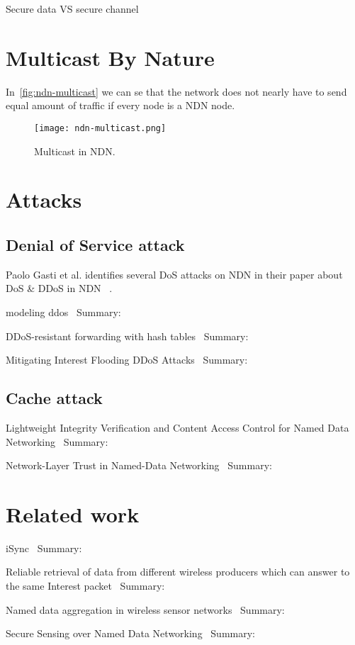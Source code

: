Secure data VS secure channel

\section{Multicast By Nature}\label{ndn-multicast}

In~\autoref{fig:ndn-multicast} we can se that the network does not nearly have to send equal amount of traffic if every node is a \gls{NDN} node.
\begin{figure}[ht]
  \centering
  \texttt{[image: ndn-multicast.png]}
  \caption{Multicast in NDN.}
  \label{fig:ndn-multicast}
\end{figure}

\section{Attacks}

\subsection{Denial of Service attack}
Paolo Gasti et al. identifies several \gls{DoS} attacks on \gls{NDN} in their paper about \gls{DoS} \& \gls{DDoS} in \gls{NDN} ~\cite{DBLP:conf/icccn/GastiTU013}. 


modeling ddos~\cite{DBLP:journals/ijcomsys/WangCZQZ14}
Summary:


DDoS-resistant forwarding with hash tables~\cite{DBLP:conf/ancs/SoNO13}
Summary:


Mitigating Interest Flooding DDoS Attacks~\cite{DBLP:journals/corr/abs-1303-4823}
Summary:

\subsection{Cache attack}

Lightweight Integrity Verification and Content Access Control for Named Data Networking~\cite{DBLP:journals/tifs/LiZZSF15}
Summary:


Network-Layer Trust in Named-Data Networking~\cite{DBLP:journals/ccr/GhaliTU14}
Summary:


\section{Related work}
iSync~\cite{DBLP:conf/acmicn/FuAC14}
Summary:


Reliable retrieval of data from different wireless producers which can answer to the same Interest packet~\cite{DBLP:conf/acmicn/AmadeoCM14}
Summary:


Named data aggregation in wireless sensor networks~\cite{DBLP:conf/noms/AbidySLF14}
Summary:


Secure Sensing over Named Data Networking~\cite{DBLP:conf/nca/BurkeGNT14}
Summary: